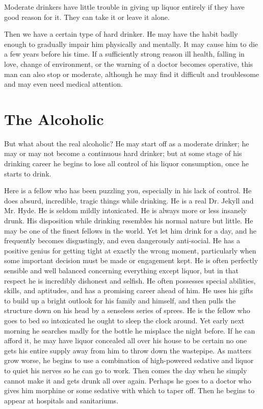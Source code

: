 Moderate drinkers have little trouble in giving up liquor entirely if they have good reason for it. 
They can take it or leave it alone.

Then we have a certain type of hard drinker. 
He may have the habit badly enough to gradually impair him physically and mentally. 
It may cause him to die a few years before his time. 
If a sufficiently strong reason ill health, falling in love, change of environment, or the warning of a doctor becomes operative, 
this man can also stop or moderate, 
although he may find it difficult and troublesome and may even need medical attention.


\section{The Alcoholic}

But what about the real alcoholic? 
He may start off as a moderate drinker; 
he may or may not become a continuous hard drinker; 
but at some stage of his drinking career he begins to lose all control of his liquor consumption, 
once he starts to drink.

Here is a fellow who has been puzzling you, especially in his lack of control. 
He does absurd, incredible, tragic things while drinking. 
He is a real Dr. Jekyll and Mr. Hyde. 
He is seldom mildly intoxicated. 
He is always more or less insanely drunk. 
His disposition while drinking resembles his normal nature but little. 
He may be one of the finest fellows in the world. 
Yet let him drink for a day, and he frequently becomes disgustingly, and even dangerously anti-social. 
He has a positive genius for getting tight at exactly the wrong moment, 
particularly when some important decision must be made or engagement kept. 
He is often perfectly sensible and well balanced concerning everything except liquor, 
but in that respect he is incredibly dishonest and selfish. 
He often possesses special abilities, skills, and aptitudes, 
and has a promising career ahead of him. 
He uses his gifts to build up a bright outlook for his family and himself, 
and then pulls the structure down on his head by a senseless series of sprees. 
He is the fellow who goes to bed so intoxicated he ought to sleep the clock around. 
Yet early next morning he searches madly for the bottle he misplace the night before. 
If he can afford it, he may have liquor concealed all over his house to be certain no one gets his entire supply away from him to throw down the wastepipe. 
As matters grow worse, he begins to use a combination of high-powered sedative and liquor to quiet his nerves so he can go to work. 
Then comes the day when he simply cannot make it and gets drunk all over again. 
Perhaps he goes to a doctor who gives him morphine or some sedative with which to taper off. 
Then he begins to appear at hospitals and sanitariums.

